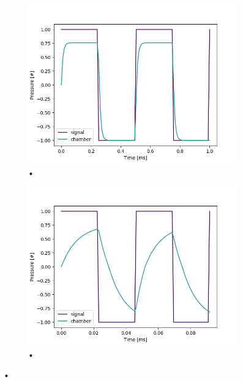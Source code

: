 \documentclass[fontsize=12pt, a4paper]{scrartcl}
\begin{document}
\begin{figure}[H]
    \centering
    \begin{subfigure}[H]{0.48\textwidth}
        \includegraphics[width=\textwidth, valign=t]{bilder/frequency/frequency_default_2kHz.png}
        \caption{•}
    \end{subfigure}
    \begin{subfigure}[H]{0.48\textwidth}
        \includegraphics[width=\textwidth, valign=t]{bilder/frequency/frequency_to_fast_21_8 khz.png}
        \caption{•}
    \end{subfigure}
    \caption{•}
\end{figure}
\end{document}
